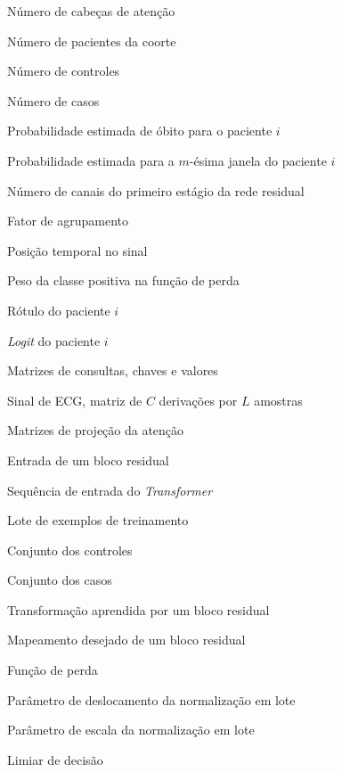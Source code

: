 \begin{simbolos}
	\item[$ n_h $] Número de cabeças de atenção
	\item[$ N $] Número de pacientes da coorte
	\item[$ N_0 $] Número de controles
	\item[$ N_1 $] Número de casos
	\item[$ \hat{p}_i $] Probabilidade estimada de óbito para o paciente $i$
	\item[$ \hat{p}_{i,m} $] Probabilidade estimada para a $m$-ésima janela do paciente $i$
	\item[$ P $] Número de canais do primeiro estágio da rede residual
	\item[$ r $] Fator de agrupamento
	\item[$ t $] Posição temporal no sinal
	\item[$ w_{+} $] Peso da classe positiva na função de perda
	\item[$ y_i $] Rótulo do paciente $i$
	\item[$ z_i $] \textit{Logit} do paciente $i$
	\item[$ \mathbf{Q}, \mathbf{K}, \mathbf{V} $] Matrizes de consultas, chaves e valores
	\item[$ \mathbf{S} $] Sinal de \gls{ECG}, matriz de $C$ derivações por $L$ amostras
	\item[$ \mathbf{U}_Q, \mathbf{U}_K, \mathbf{U}_V, \mathbf{U}_O $] Matrizes de projeção da atenção
	\item[$ \mathbf{x} $] Entrada de um bloco residual
	\item[$ \mathbf{X} $] Sequência de entrada do \textit{Transformer}
	\item[$ \mathcal{B} $] Lote de exemplos de treinamento
	\item[$ \mathcal{C}_0 $] Conjunto dos controles
	\item[$ \mathcal{C}_1 $] Conjunto dos casos
	\item[$ \mathcal{F} $] Transformação aprendida por um bloco residual
	\item[$ \mathcal{H} $] Mapeamento desejado de um bloco residual
	\item[$ \mathcal{L} $] Função de perda
	\item[$ \beta $] Parâmetro de deslocamento da normalização em lote
	\item[$ \gamma $] Parâmetro de escala da normalização em lote
	\item[$ \delta $] Limiar de decisão

\end{simbolos}
